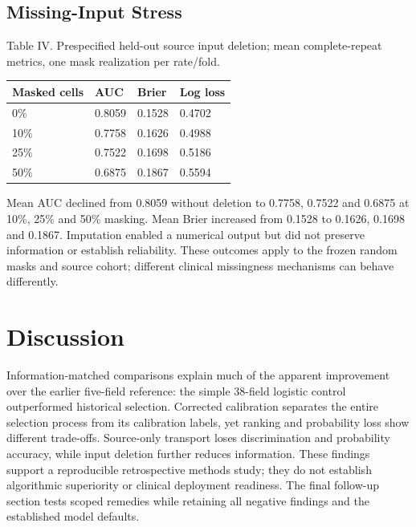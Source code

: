 \documentclass[conference]{IEEEtran}
\begin{document}
\subsection{Missing-Input Stress}
\begin{center}\begin{minipage}{\columnwidth}\centering\footnotesize
Table IV. Prespecified held-out source input deletion; mean complete-repeat metrics, one mask realization per rate/fold.\par\vspace{3pt}
\setlength{\tabcolsep}{2.5pt}
\begin{tabular}{p{}p{}p{}p{}}
\toprule
Masked cells & AUC & Brier & Log loss \\
\midrule
0\% & 0.8059 & 0.1528 & 0.4702 \\
10\% & 0.7758 & 0.1626 & 0.4988 \\
25\% & 0.7522 & 0.1698 & 0.5186 \\
50\% & 0.6875 & 0.1867 & 0.5594 \\
\bottomrule
\end{tabular}
\end{minipage}\end{center}
Mean AUC declined from 0.8059 without deletion to 0.7758, 0.7522 and 0.6875 at 10\%, 25\% and 50\% masking. Mean Brier increased from 0.1528 to 0.1626, 0.1698 and 0.1867. Imputation enabled a numerical output but did not preserve information or establish reliability. These outcomes apply to the frozen random masks and source cohort; different clinical missingness mechanisms can behave differently.


\section{Discussion}
Information-matched comparisons explain much of the apparent improvement over the earlier five-field reference: the simple 38-field logistic control outperformed historical selection. Corrected calibration separates the entire selection process from its calibration labels, yet ranking and probability loss show different trade-offs. Source-only transport loses discrimination and probability accuracy, while input deletion further reduces information. These findings support a reproducible retrospective methods study; they do not establish algorithmic superiority or clinical deployment readiness. The final follow-up section tests scoped remedies while retaining all negative findings and the established model defaults.
\end{document}
